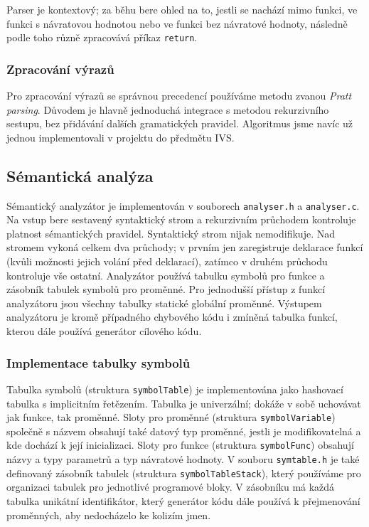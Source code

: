 Parser je kontextový; za běhu bere ohled na to, jestli se nachází mimo funkci,
ve funkci s návratovou hodnotou nebo ve funkci bez návratové hodnoty,
následně podle toho různě zpracovává příkaz \texttt{return}.

\subsubsection{Zpracování výrazů}
Pro zpracování výrazů se správnou precedencí používáme metodu zvanou \textit{Pratt parsing}.
Důvodem je hlavně jednoduchá integrace s metodou rekurzivního sestupu, bez přidávání dalších gramatických pravidel.
Algoritmus jsme navíc už jednou implementovali v projektu do předmětu IVS.

\subsection{Sémantická analýza}
Sémantický analyzátor je implementován v souborech \texttt{analyser.h} a \texttt{analyser.c}.
Na vstup bere sestavený syntaktický strom a rekurzivním průchodem kontroluje platnost sémantických pravidel.
Syntaktický strom nijak nemodifikuje.
Nad stromem vykoná celkem dva průchody; v prvním jen zaregistruje deklarace funkcí (kvůli možnosti jejich volání před deklarací),
zatímco v druhém průchodu kontroluje vše ostatní.
Analyzátor používá tabulku symbolů pro funkce a zásobník tabulek symbolů pro proměnné.
Pro jednodušší přístup z funkcí analyzátoru jsou všechny tabulky statické globální proměnné.
Výstupem analyzátoru je kromě případného chybového kódu i zmíněná tabulka funkcí, kterou dále používá generátor cílového kódu.

\subsubsection{Implementace tabulky symbolů}
Tabulka symbolů (struktura \texttt{symbolTable}) je implementována jako hashovací tabulka s implicitním řetězením.
Tabulka je univerzální; dokáže v sobě uchovávat jak funkce, tak proměnné.
Sloty pro proměnné (struktura \texttt{symbolVariable}) společně s názvem obsahují také datový typ proměnné,
jestli je modifikovatelná a kde dochází k její inicializaci.
Sloty pro funkce (struktura \texttt{symbolFunc}) obsahují názvy a typy parametrů a typ návratové hodnoty.
V souboru \texttt{symtable.h} je také definovaný zásobník tabulek (struktura \texttt{symbolTableStack}),
který používáme pro organizaci tabulek pro jednotlivé programové bloky.
V zásobníku má každá tabulka unikátní identifikátor,
který generátor kódu dále používá k přejmenování proměnných, aby nedocházelo ke kolizím jmen.

